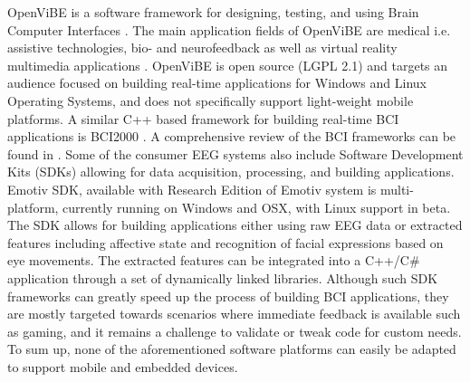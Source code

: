 \documentclass[10pt]{article}
\begin{document}
OpenViBE is a software framework for designing, testing, and using Brain Computer Interfaces \cite{renard2010openvibe}. The main application fields of OpenViBE are medical i.e. assistive technologies, bio- and neurofeedback as well as virtual reality multimedia applications . OpenViBE is open source (LGPL 2.1) and targets an audience focused on building real-time applications for  Windows and Linux Operating Systems, and does not specifically support light-weight mobile platforms.  A similar C++ based framework for building real-time BCI applications is BCI2000 \cite{schalk2004bci2000}. A comprehensive review of the BCI frameworks can be found in \cite{brunner2011bci}. Some of the consumer EEG systems also include Software Development Kits (SDKs) allowing for data acquisition, processing, and building applications.
Emotiv SDK, available with Research Edition of Emotiv system is multi-platform, currently running on Windows and OSX, with Linux support in beta. The SDK allows for building applications either using raw EEG data or extracted features including affective state and recognition of facial expressions based on eye movements. The extracted features can be integrated into a C++/C\# application through a set of dynamically linked libraries. Although such SDK frameworks can greatly speed up the process of building BCI applications, they are mostly targeted towards scenarios where immediate feedback is available such as gaming, and it remains a challenge to validate or tweak code for custom needs. To sum up, none of the aforementioned software platforms can easily be adapted to support mobile and embedded devices.
\end{document}
